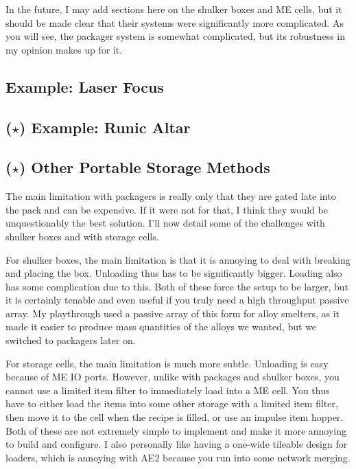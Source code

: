 \documentclass{notes}
\begin{document}
In the future, I may add sections here on the shulker boxes and ME cells, but it should be made clear that their systems were significantly more complicated. As you will see, the packager system is somewhat complicated, but its robustness in my opinion makes up for it.

\subsection{Example: Laser Focus}

\subsection{($\star$) Example: Runic Altar}

\subsection{($\star$) Other Portable Storage Methods}
The main limitation with packagers is really only that they are gated late into the pack and can be expensive. If it were not for that, I think they would be unquestionably the best solution. I'll now detail some of the challenges with shulker boxes and with storage cells.

For shulker boxes, the main limitation is that it is annoying to deal with breaking and placing the box. Unloading thus has to be significantly bigger. Loading also has some complication due to this. Both of these force the setup to be larger, but it is certainly tenable and even useful if you truly need a high throughput passive array. My playthrough used a passive array of this form for alloy smelters, as it made it easier to produce mass quantities of the alloys we wanted, but we switched to packagers later on.

For storage cells, the main limitation is much more subtle. Unloading is easy because of ME IO ports. However, unlike with packages and shulker boxes, you cannot use a limited item filter to immediately load into a ME cell. You thus have to either load the items into some other storage with a limited item filter, then move it to the cell when the recipe is filled, or use an impulse item hopper. Both of these are not extremely simple to implement and make it more annoying to build and configure. I also personally like having a one-wide tileable design for loaders, which is annoying with AE2 because you run into some network merging.
\end{document}
